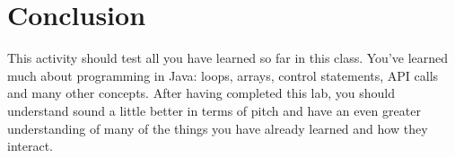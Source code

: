\section{Conclusion}

This activity should test all you have learned so far in this class.  
You’ve learned much about programming in Java: loops, arrays, control statements, API calls and many other concepts.  
After having completed this lab, you should understand sound a little better in terms of pitch and have an even greater understanding of many of the things you have already learned and how they interact.
